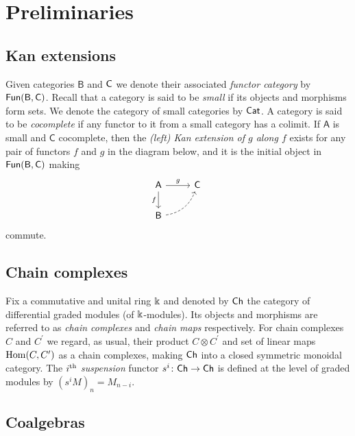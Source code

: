 
\section{Preliminaries}

\subsection{Kan extensions}

Given categories $\mathsf{B}$ and $\mathsf{C}$ we denote their associated \textit{functor category} by $\mathsf{Fun}(\mathsf{B}, \mathsf{C})$.
Recall that a category is said to be \textit{small} if its objects and morphisms form sets.
We denote the category of small categories by $\mathsf{Cat}$.
A category is said to be \textit{cocomplete} if any functor to it from a small category has a colimit.
If $\mathsf{A}$ is small and $\mathsf{C}$ cocomplete, then the \textit{(left) Kan extension of $g$ along $f$} exists for any pair of functors $f$ and $g$ in the diagram below, and it is the initial object in $\mathsf{Fun}(\mathsf{B}, \mathsf{C})$ making
\begin{equation*}
\begin{tikzcd}[column sep=normal, row sep=normal]
\mathsf{A} \arrow[d, "f"'] \arrow[r, "g"] & \mathsf{C} \\ 
\mathsf{B} \arrow[dashed, ur, bend right] & \quad 
\end{tikzcd}
\end{equation*}
commute.

\subsection{Chain complexes}

Fix a commutative and unital ring $\Bbbk$ and denoted by $\mathsf{Ch}$ the category of differential graded modules (of $\Bbbk$-modules).
Its objects and morphisms are referred to as \textit{chain complexes} and \textit{chain maps} respectively.
For chain complexes $C$ and $C^\prime$ we regard, as usual, their product $C \otimes C^\prime$ and set of linear maps $\mathrm{Hom}(C, C^\prime)$ as a chain complexes, making $\mathsf{Ch}$ into a closed symmetric monoidal category.
The $i^\mathrm{th}$ \textit{suspension} functor $s^i \colon \mathsf{Ch} \to \mathsf{Ch}$ is defined at the level of graded modules by $(s^{i}M)_n = M_{n-i}$.

\subsection{Coalgebras}

